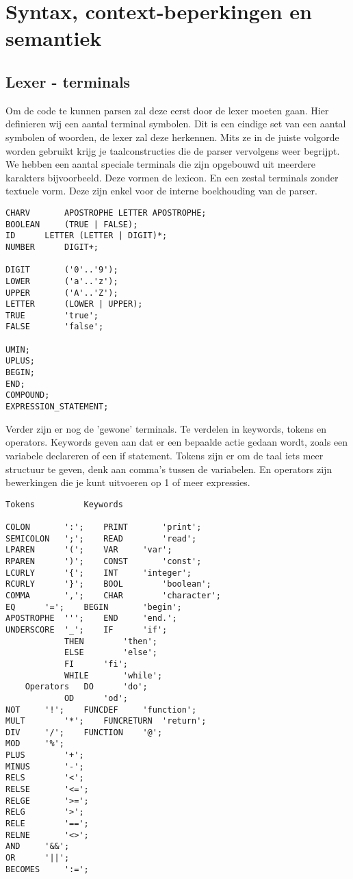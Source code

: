 \documentclass[]{article}
\begin{document}
\newpage
\section{Syntax, context-beperkingen en semantiek}


\subsection{Lexer - terminals}
Om de code te kunnen parsen zal deze eerst door de lexer moeten gaan. Hier definieren wij een aantal terminal symbolen. Dit is een eindige set van een aantal symbolen of woorden, de lexer zal deze herkennen. Mits ze in de juiste volgorde worden gebruikt krijg je taalconstructies die de parser vervolgens weer begrijpt. We hebben een aantal speciale terminals die zijn opgebouwd uit meerdere karakters bijvoorbeeld. Deze vormen de lexicon. En een zestal terminals zonder textuele vorm. Deze zijn enkel voor de interne boekhouding van de parser.
\\
\begin{lstlisting}[style=ANTLR]
CHARV		APOSTROPHE LETTER APOSTROPHE;
BOOLEAN		(TRUE | FALSE);
ID		LETTER (LETTER | DIGIT)*;
NUMBER		DIGIT+;
	
DIGIT		('0'..'9');
LOWER		('a'..'z');
UPPER		('A'..'Z');
LETTER		(LOWER | UPPER);
TRUE		'true';
FALSE		'false';

UMIN;
UPLUS;
BEGIN;
END;
COMPOUND;
EXPRESSION_STATEMENT;			
\end{lstlisting}

\newpage 

Verder zijn er nog de 'gewone' terminals. Te verdelen in keywords, tokens en operators. Keywords geven aan dat er een bepaalde actie gedaan wordt, zoals een variabele declareren of een if statement. Tokens zijn er om de taal iets meer structuur te geven, denk aan comma's tussen de variabelen. En operators zijn bewerkingen die je kunt uitvoeren op 1 of meer expressies.
\\
\begin{lstlisting}[style=ANTLR]
	Tokens			Keywords
	
COLON		':';	PRINT		'print';
SEMICOLON	';';	READ		'read';
LPAREN		'(';	VAR		'var';
RPAREN		')';	CONST		'const';
LCURLY		'{';	INT		'integer';
RCURLY		'}';	BOOL		'boolean';
COMMA		',';	CHAR		'character';
EQ		'=';	BEGIN		'begin';
APOSTROPHE	''';	END		'end.';
UNDERSCORE	'_';	IF		'if';
			THEN		'then';
			ELSE		'else';
			FI		'fi';
			WHILE		'while';
	Operators	DO		'do';
			OD		'od';
NOT		'!';	FUNCDEF		'function';
MULT		'*';	FUNCRETURN	'return';
DIV		'/';	FUNCTION	'@';
MOD		'%';
PLUS		'+';
MINUS		'-';
RELS		'<';
RELSE		'<=';
RELGE		'>=';
RELG		'>';
RELE		'==';
RELNE		'<>';
AND		'&&';
OR		'||';
BECOMES		':=';
\end{lstlisting}
\newpage
\end{document}
